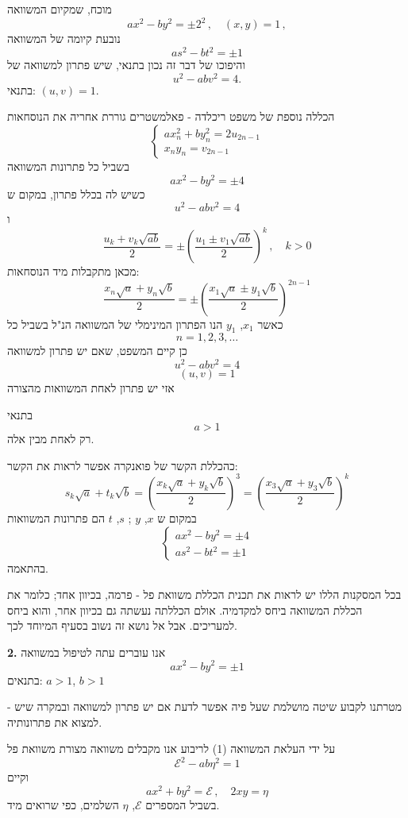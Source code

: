 מוכח, שמקיום המשוואה
\[ ax^2 - by^2 = \pm 2^2 \, , \quad (x,y) = 1 \, , \]
נובעת קיומה של המשוואה
\[ as^2 - bt^2 = \pm 1 \]
והיפוכו של דבר זה נכון בתנאי, שיש פתרון למשוואה של
\[ u^2 - abv^2 = 4 . \]
בתנאי: $(u,v) = 1$.

\medskip
\noindent הכללה נוספת של משפט ריכלדה - פאלמשטרים גוררת אחריה את הנוסחאות
\[ \begin{cases} ax_n^2 + by_n^2 = 2u_{2n-1} \\ x_n y_n = v_{2n-1} \end{cases} \]
בשביל כל פתרונות המשוואה
\[ ax^2 - by^2 = \pm 4 \]
כשיש לה בכלל פתרון, במקום ש
\[ u^2 - abv^2 = 4 \]
ו
\[ \frac{u_k + v_k\sqrt{ab}}{2} = \pm \left(\frac{u_1 \pm v_1\sqrt{ab}}{2}\right)^k \, , \quad k>0 \]
מכאן מתקבלות מיד הנוסחאות:
\[ \frac{x_n\sqrt{a} + y_n\sqrt{b}}{2} = \pm \left(\frac{x_1\sqrt{a} \pm y_1\sqrt{b}}{2}\right)^{2n - 1} \]
כאשר $x_1$, $y_1$ הנו הפתרון המינימלי של המשוואה הנ"ל בשביל כל
\[ n = 1 , 2 , 3 , \ldots \]
כן קיים המשפט, שאם יש פתרון למשוואה
\[ u^2 - abv^2 = 4 \]
\[ (u , v ) = 1 \]
אזי יש פתרון לאחת המשוואות מהצורה

\noindent בתנאי
\[ a > 1 \]
רק לאחת מבין אלה.

\medskip
\noindent כהכללת הקשר של פואנקרה אפשר לראות את הקשר:
\[ s_k\sqrt{a} + t_k\sqrt{b} = \left(\frac{x_k\sqrt{a} + y_k\sqrt{b}}{2}\right)^3 = \left(\frac{x_3\sqrt{a} + y_3\sqrt{b}}{2}\right)^k \]
במקום ש $x$, $y$ ; $s$, $t$ הם פתרונות המשוואות
\[ \begin{cases} ax^2 - by^2 = \pm 4 \\ as^2 - bt^2 = \pm 1 \end{cases} \]
בהתאמה.

\medskip
\noindent בכל המסקנות הללו יש לראות את תכנית הכללת משוואת פל - פרמה, בכיוון אחד; כלומר את הכללת המשוואה ביחס למקדמיה. אולם הכללתה נעשתה גם בכיוון אחר, והוא ביחס למעריכים. אבל אל נושא זה נשוב בסעיף המיוחד לכך.

\bigskip
\noindent\textbf{2.} אנו עוברים עתה לטיפול במשוואה
\[ ax^2 - by^2 = \pm 1 \tag{1} \]
בתנאים: $a>1$, $b>1$

\noindent מטרתנו לקבוע שיטה מושלמת שעל פיה אפשר לדעת אם יש פתרון למשוואה ובמקרה שיש - למצוא את פתרונותיה.

\noindent על ידי העלאת המשוואה (1) לריבוע אנו מקבלים משוואה מצורת משוואת פל
\[ \mathcal{E}^2 - ab\eta^2 = 1 \tag{2} \]
וקיים
\[ ax^2 + by^2 = \mathcal{E} \, , \quad 2xy = \eta \tag{3} \]
בשביל המספרים $\mathcal{E}$, $\eta$ השלמים, כפי שרואים מיד.

